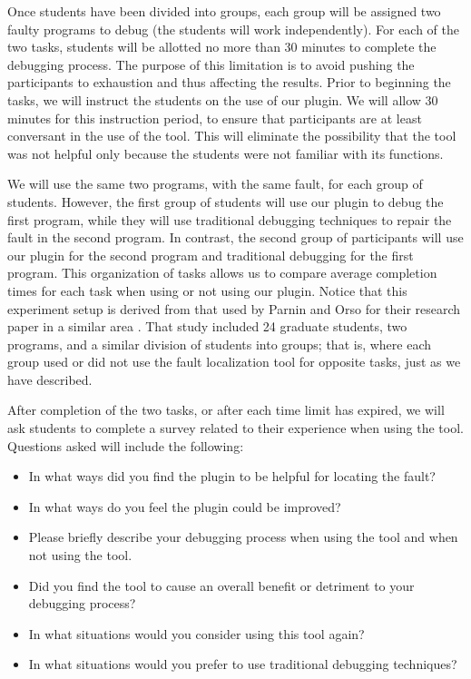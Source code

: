 Once students have been divided into groups, each group will be assigned two faulty
programs to debug (the students will work independently).  For each of the two tasks, 
students will be allotted no more than 30
minutes to complete the debugging process.  The purpose of this limitation is to avoid
pushing the participants to exhaustion and thus affecting the results.  Prior to beginning
the tasks, we will instruct the students on the use of our plugin.  We will allow 30 
minutes for this instruction period, to ensure that participants are at least conversant
in the use of the tool.  This will eliminate the possibility that the tool was not helpful
only because the students were not familiar with its functions.  

We will use the same two
programs, with the same fault, for each group of students.  However, the first group of
students will use our plugin to debug the first program, while they will use
traditional debugging techniques to repair the fault in the second program.  In contrast,
the second group of participants will use our plugin for the second program and 
traditional debugging for the first program.  This organization of tasks allows us to 
compare average completion times for each task when using or not using our plugin.
Notice that this experiment setup is derived from that used by Parnin and Orso for their
research paper in a similar area \cite{parnin}.  That study included 24 graduate students,
two programs, and a similar division of students into groups; that is, where each group 
used or did not use the fault localization tool for opposite tasks, just as we have described.

After completion of the two tasks, or after each time limit has expired, we will ask students
to complete a survey related to their experience when using the tool.  Questions asked will
include the following:

\begin{itemize}
\item In what ways did you find the plugin to be helpful for locating the fault?
\item In what ways do you feel the plugin could be improved?
\item Please briefly describe your debugging process when using the tool and when not using the tool.
\item Did you find the tool to cause an overall benefit or detriment to your debugging process?
\item In what situations would you consider using this tool again?
\item In what situations would you prefer to use traditional debugging techniques?
\end{itemize}

